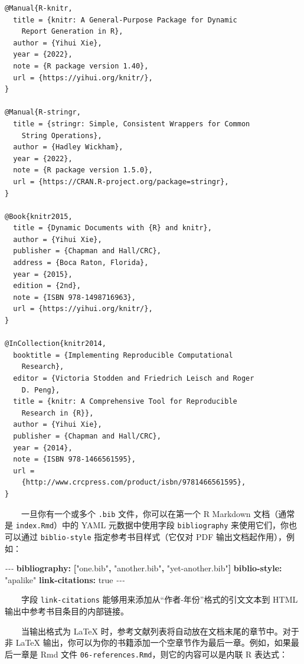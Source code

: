 \documentclass[
  12pt,
]{krantz}
\newenvironment{Shaded}{\begin{snugshade}}{\end{snugshade}}
\newcommand{\AttributeTok}[1]{\textcolor[rgb]{0.13,0.29,0.53}{#1}}
\newcommand{\CharTok}[1]{\textcolor[rgb]{0.31,0.60,0.02}{#1}}
\newcommand{\FunctionTok}[1]{\textcolor[rgb]{0.13,0.29,0.53}{\textbf{#1}}}
\newcommand{\KeywordTok}[1]{\textcolor[rgb]{0.13,0.29,0.53}{\textbf{#1}}}
\newcommand{\PreprocessorTok}[1]{\textcolor[rgb]{0.56,0.35,0.01}{\textit{#1}}}
\newcommand{\StringTok}[1]{\textcolor[rgb]{0.31,0.60,0.02}{#1}}
\theoremstyle{definition}
\theoremstyle{definition}
\theoremstyle{definition}
\theoremstyle{definition}
\theoremstyle{remark}
\begin{document}
\begin{verbatim}
@Manual{R-knitr,
  title = {knitr: A General-Purpose Package for Dynamic
    Report Generation in R},
  author = {Yihui Xie},
  year = {2022},
  note = {R package version 1.40},
  url = {https://yihui.org/knitr/},
}

@Manual{R-stringr,
  title = {stringr: Simple, Consistent Wrappers for Common
    String Operations},
  author = {Hadley Wickham},
  year = {2022},
  note = {R package version 1.5.0},
  url = {https://CRAN.R-project.org/package=stringr},
}

@Book{knitr2015,
  title = {Dynamic Documents with {R} and knitr},
  author = {Yihui Xie},
  publisher = {Chapman and Hall/CRC},
  address = {Boca Raton, Florida},
  year = {2015},
  edition = {2nd},
  note = {ISBN 978-1498716963},
  url = {https://yihui.org/knitr/},
}

@InCollection{knitr2014,
  booktitle = {Implementing Reproducible Computational
    Research},
  editor = {Victoria Stodden and Friedrich Leisch and Roger
    D. Peng},
  title = {knitr: A Comprehensive Tool for Reproducible
    Research in {R}},
  author = {Yihui Xie},
  publisher = {Chapman and Hall/CRC},
  year = {2014},
  note = {ISBN 978-1466561595},
  url =
    {http://www.crcpress.com/product/isbn/9781466561595},
}
\end{verbatim}

  一旦你有一个或多个 \texttt{.bib} 文件，你可以在第一个 R Markdown 文档（通常是 \texttt{index.Rmd}）中的 YAML 元数据中使用字段 \texttt{bibliography} 来使用它们，你也可以通过 \texttt{biblio-style} 指定参考书目样式（它仅对 PDF 输出文档起作用），例如：

\begin{Shaded}
\begin{Highlighting}[]
\PreprocessorTok{{-}{-}{-}}
\FunctionTok{bibliography}\KeywordTok{:}\AttributeTok{ }\KeywordTok{[}\StringTok{"one.bib"}\KeywordTok{,}\AttributeTok{ }\StringTok{"another.bib"}\KeywordTok{,}\AttributeTok{ }\StringTok{"yet{-}another.bib"}\KeywordTok{]}
\FunctionTok{biblio{-}style}\KeywordTok{:}\AttributeTok{ }\StringTok{"apalike"}
\FunctionTok{link{-}citations}\KeywordTok{:}\AttributeTok{ }\CharTok{true}
\PreprocessorTok{{-}{-}{-}}
\end{Highlighting}
\end{Shaded}

  字段 \texttt{link-citations} 能够用来添加从``作者-年份''格式的引文文本到 HTML 输出中参考书目条目的内部链接。

  当输出格式为 LaTeX 时，参考文献列表将自动放在文档末尾的章节中。对于非 LaTeX 输出，你可以为你的书籍添加一个空章节作为最后一章。例如，如果最后一章是 Rmd 文件 \texttt{06-references.Rmd}，则它的内容可以是内联 R 表达式：
\end{document}
